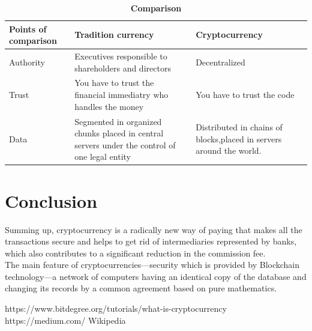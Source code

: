 \documentclass[9pt,twocolumn,twoside]{optica-suppl-materials}
\begin{document}
\begin{table}[htbp]
\centering
\caption{\bf Comparison}
\begin{tabular}{|p{2cm}|p{3cm}|p{3cm}|}
\hline
Points of comparison & Tradition currency & Cryptocurrency\\
\hline
Authority & Executives responsible to shareholders and directors & Decentralized\\
\hline
Trust & You have to trust the financial immediatry who handles the money & You have to trust the code \\
\hline
Data & Segmented in organized chunks placed in central servers under the control of one legal entity & Distributed in chains of blocks,placed in servers around the world.  \\
\hline
\end{tabular}
  \label{tab:shape-functions}
\end{table}

\section{Conclusion}
Summing up, cryptocurrency is a radically new way of paying
that makes all the transactions secure and helps to get rid of
intermediaries represented by banks, which also contributes to
a significant reduction in the commission fee.\\
The main feature of cryptocurrencies—security which is
provided by Blockchain technology—a network of computers
having an identical copy of the database and changing its
records by a common agreement based on pure mathematics.

\begin{thebibliography}{}
\bibitem{}https://www.bitdegree.org/tutorials/what-is-cryptocurrency
\bibitem{}https://medium.com/
\bibitem{}Wikipedia

\end{thebibliography}



\end{document}
